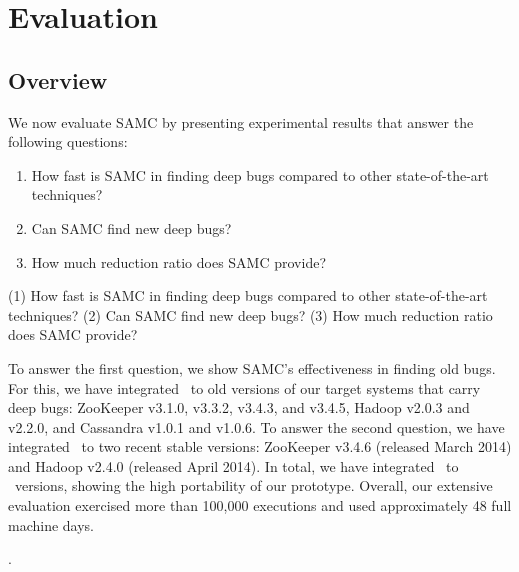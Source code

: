 
\chapter{Evaluation}
\label{sec-eval}


\section{Overview}
We now evaluate SAMC by presenting experimental results that answer the
following questions: 
\begin{enumerate}
\item How fast is SAMC in finding deep bugs compared to other state-of-the-art techniques?  
\item Can SAMC find new deep bugs?  
\item How much reduction ratio does SAMC provide?
\end{enumerate}

(1) How fast is SAMC in finding deep bugs compared to
other state-of-the-art techniques?  (2) Can SAMC find new deep bugs?  (3)
How much reduction ratio does SAMC provide?
\fi

To answer the first question, we show SAMC's effectiveness in finding old
bugs.  For this, we have integrated \sampro\ to old versions of our target
systems that carry deep bugs: ZooKeeper v3.1.0, v3.3.2, v3.4.3, and v3.4.5,
Hadoop v2.0.3 and v2.2.0, and Cassandra v1.0.1 and v1.0.6.  To answer the
second question, we have integrated \sampro\ to two recent stable versions:
ZooKeeper v3.4.6 (released March 2014) and Hadoop v2.4.0 (released April
2014).  In total, we have integrated \sampro\ to \numVersions\ versions,
showing the high portability of our prototype.  Overall, our extensive
evaluation exercised more than 100,000 executions and used approximately 48
full machine days.




.
\fi
